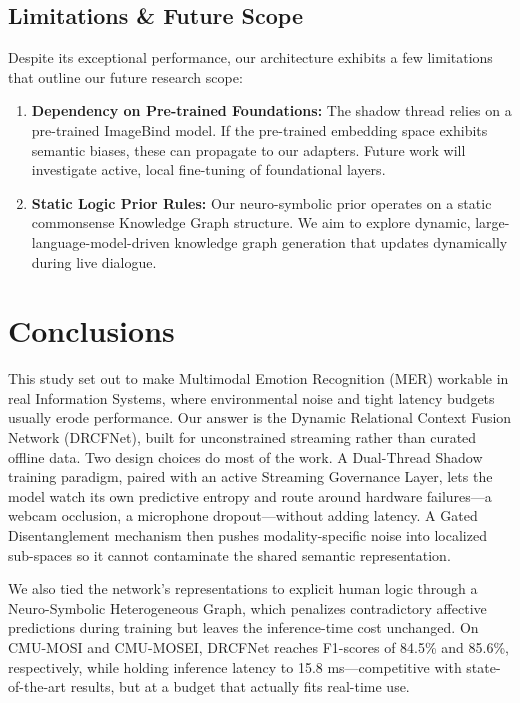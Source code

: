 \documentclass[sn-mathphys,Numbered]{sn-jnl}
\theoremstyle{thmstyleone}
\theoremstyle{thmstyletwo}
\theoremstyle{thmstylethree}
\begin{document}
\subsection{Limitations \& Future Scope}\label{subsec:limitations}
Despite its exceptional performance, our architecture exhibits a few limitations that outline our future research scope:
\begin{enumerate}
    \item \textbf{Dependency on Pre-trained Foundations:} The shadow thread relies on a pre-trained ImageBind model. If the pre-trained embedding space exhibits semantic biases, these can propagate to our adapters. Future work will investigate active, local fine-tuning of foundational layers.
    \item \textbf{Static Logic Prior Rules:} Our neuro-symbolic prior operates on a static commonsense Knowledge Graph structure. We aim to explore dynamic, large-language-model-driven knowledge graph generation that updates dynamically during live dialogue.
\end{enumerate}

\section{Conclusions}\label{sec:conclusion}

This study set out to make Multimodal Emotion Recognition (MER) workable in real Information Systems, where environmental noise and tight latency budgets usually erode performance. Our answer is the Dynamic Relational Context Fusion Network (DRCFNet), built for unconstrained streaming rather than curated offline data. Two design choices do most of the work. A Dual-Thread Shadow training paradigm, paired with an active Streaming Governance Layer, lets the model watch its own predictive entropy and route around hardware failures---a webcam occlusion, a microphone dropout---without adding latency. A Gated Disentanglement mechanism then pushes modality-specific noise into localized sub-spaces so it cannot contaminate the shared semantic representation.

We also tied the network's representations to explicit human logic through a Neuro-Symbolic Heterogeneous Graph, which penalizes contradictory affective predictions during training but leaves the inference-time cost unchanged. On CMU-MOSI and CMU-MOSEI, DRCFNet reaches F1-scores of 84.5\% and 85.6\%, respectively, while holding inference latency to 15.8 ms---competitive with state-of-the-art results, but at a budget that actually fits real-time use.
\end{document}
